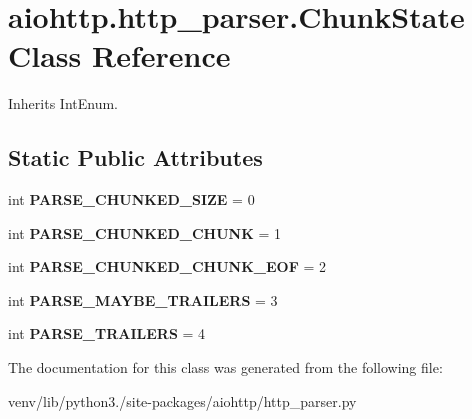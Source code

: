 \hypertarget{classaiohttp_1_1http__parser_1_1_chunk_state}{}\section{aiohttp.\+http\+\_\+parser.\+Chunk\+State Class Reference}
\label{classaiohttp_1_1http__parser_1_1_chunk_state}


Inherits Int\+Enum.

\subsection*{Static Public Attributes}
\begin{DoxyCompactItemize}
\item 
\mbox{\label{classaiohttp_1_1http__parser_1_1_chunk_state_aa46ef3fcfd39659246ad5f0103aa2095}} 
int {\bfseries P\+A\+R\+S\+E\+\_\+\+C\+H\+U\+N\+K\+E\+D\+\_\+\+S\+I\+ZE} = 0
\item 
\mbox{\label{classaiohttp_1_1http__parser_1_1_chunk_state_a279aefcd8f26a6a0331c967743f0bc48}} 
int {\bfseries P\+A\+R\+S\+E\+\_\+\+C\+H\+U\+N\+K\+E\+D\+\_\+\+C\+H\+U\+NK} = 1
\item 
\mbox{\label{classaiohttp_1_1http__parser_1_1_chunk_state_aeaf09ad99539e673e7f5be1bb926b8b0}} 
int {\bfseries P\+A\+R\+S\+E\+\_\+\+C\+H\+U\+N\+K\+E\+D\+\_\+\+C\+H\+U\+N\+K\+\_\+\+E\+OF} = 2
\item 
\mbox{\label{classaiohttp_1_1http__parser_1_1_chunk_state_ad3f1ab0f2a13184687197473c693d427}} 
int {\bfseries P\+A\+R\+S\+E\+\_\+\+M\+A\+Y\+B\+E\+\_\+\+T\+R\+A\+I\+L\+E\+RS} = 3
\item 
\mbox{\label{classaiohttp_1_1http__parser_1_1_chunk_state_a608e4ddd0dad582f3b6e1e6697640305}} 
int {\bfseries P\+A\+R\+S\+E\+\_\+\+T\+R\+A\+I\+L\+E\+RS} = 4
\end{DoxyCompactItemize}


The documentation for this class was generated from the following file\+:\begin{DoxyCompactItemize}
\item 
venv/lib/python3./site-\/packages/aiohttp/http\+\_\+parser.\+py\end{DoxyCompactItemize}
